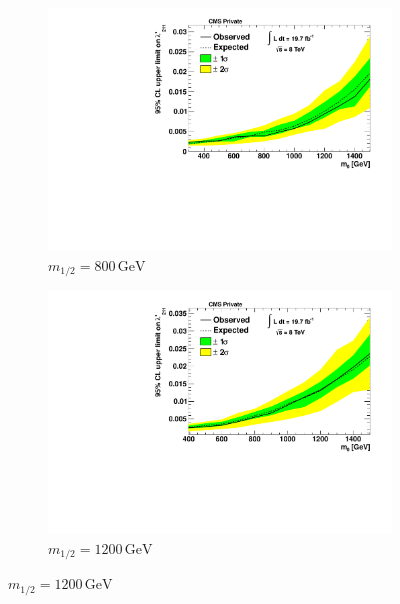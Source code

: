 \begin{figure}[!p]
  \begin{subfigure}[b]{0.495\textwidth}
    \centering
    \includegraphics[width=\textwidth]{plots/limit_m12_800.pdf}
    \caption{$m_{1/2} = 800\,\text{GeV}$\label{fig:limit-m12-800}}
  \end{subfigure}
  \begin{subfigure}[b]{0.495\textwidth}
    \centering
    \includegraphics[width=\textwidth]{plots/limit_m12_1200.pdf}
    \caption{$m_{1/2} = 1200\,\text{GeV}$\label{fig:limit-m12-1200}}
  \end{subfigure}


\end{figure}
